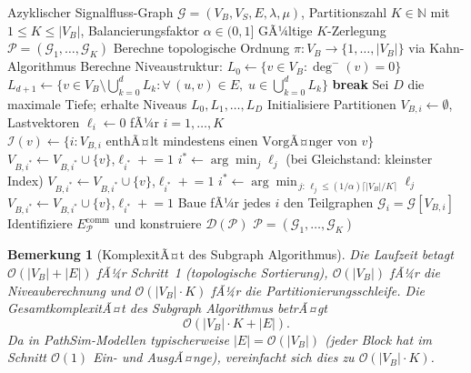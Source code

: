 ﻿\documentclass[12pt,a4paper]{article}
\newtheorem{bemerkung}[theorem]{Bemerkung}
\theoremstyle{definition}
\begin{document}
\begin{algorithm}[H]
\caption{Subgraph Algorithmus}
\label{alg:subgraph}
\begin{algorithmic}[1]
\Require Azyklischer Signalfluss-Graph $\mathcal{G} = (V_B, V_S, E, \lambda, \mu)$,
         Partitionszahl $K \in \mathbb{N}$ mit $1 \leq K \leq |V_B|$,
         Balancierungsfaktor $\alpha \in (0, 1]$
\Ensure  GÃ¼ltige $K$-Zerlegung $\mathcal{P} = (\mathcal{G}_1, \ldots, \mathcal{G}_K)$
\State Berechne topologische Ordnung $\pi : V_B \to \{1, \ldots, |V_B|\}$
       via Kahn-Algorithmus
\State Berechne Niveaustruktur: $L_0 \gets \{v \in V_B : \deg^-(v) = 0\}$
  \State $L_{d+1} \gets \bigl\{v \in V_B \setminus \bigcup_{k=0}^d L_k :
         \forall\,(u,v) \in E,\; u \in \bigcup_{k=0}^d L_k\bigr\}$
   \textbf{break} \EndIf
\EndFor
\State Sei $D$ die maximale Tiefe; erhalte Niveaus $L_0, L_1, \ldots, L_D$
\State Initialisiere Partitionen $V_{B,i} \gets \emptyset$,
       Lastvektoren $\ell_i \gets 0$ fÃ¼r $i = 1, \ldots, K$
  \State $\mathcal{I}(v) \gets \{i : V_{B,i} \text{ enthÃ¤lt mindestens einen
         VorgÃ¤nger von } v\}$
      \State $V_{B,i^*} \gets V_{B,i^*} \cup \{v\}$,\quad $\ell_{i^*} \mathrel{+}= 1$
    \Else
      \State $i^* \gets \arg\min_j \ell_j$ (bei Gleichstand: kleinster Index)
      \State $V_{B,i^*} \gets V_{B,i^*} \cup \{v\}$,\quad $\ell_{i^*} \mathrel{+}= 1$
    \EndIf
  \Else
    \State $i^* \gets \arg\min_{\,j :\, \ell_j \leq (1/\alpha)\lceil|V_B|/K\rceil} \ell_j$
    \State $V_{B,i^*} \gets V_{B,i^*} \cup \{v\}$,\quad $\ell_{i^*} \mathrel{+}= 1$
  \EndIf
\EndFor
\State Baue fÃ¼r jedes $i$ den Teilgraphen $\mathcal{G}_i = \mathcal{G}[V_{B,i}]$
\State Identifiziere $E_{\mathcal{P}}^{\mathrm{comm}}$ und
       konstruiere $\mathcal{D}(\mathcal{P})$
\State \Return $\mathcal{P} = (\mathcal{G}_1, \ldots, \mathcal{G}_K)$
\end{algorithmic}
\end{algorithm}

\begin{bemerkung}[KomplexitÃ¤t des Subgraph Algorithmus]
\label{bem:complexity}
Die Laufzeit betagt $\mathcal{O}(|V_B| + |E|)$ fÃ¼r Schritt~1 (topologische
Sortierung), $\mathcal{O}(|V_B|)$ fÃ¼r die Niveauberechnung und
$\mathcal{O}(|V_B| \cdot K)$ fÃ¼r die Partitionierungsschleife.
Die GesamtkomplexitÃ¤t des Subgraph Algorithmus betrÃ¤gt
\[
  \mathcal{O}(|V_B| \cdot K + |E|).
\]
Da in PathSim-Modellen typischerweise $|E| = \mathcal{O}(|V_B|)$
(jeder Block hat im Schnitt $\mathcal{O}(1)$ Ein- und AusgÃ¤nge), vereinfacht
sich dies zu $\mathcal{O}(|V_B| \cdot K)$.
\end{bemerkung}
\end{document}
